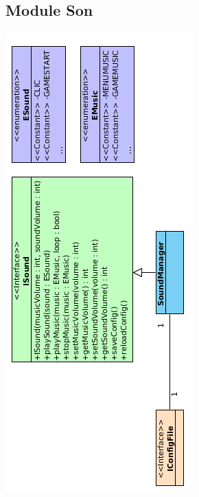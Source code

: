 \subsection{Module Son}

\begin{center}
\includegraphics[scale=1]{images/UML/sound.png}
\end{center}